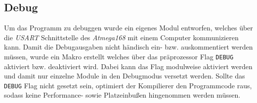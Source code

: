 \subsection{Debug}
    Um das Programm zu debuggen wurde ein eigenes Modul entworfen, welches
    über die \textit{USART} Schnittstelle des \textit{Atmega168} mit einem
    Computer kommunizieren kann. Damit die Debugausgaben nicht händisch
    ein- bzw. auskommentiert werden müssen, wurde ein Makro erstellt welches 
    über das präprozessor Flag \texttt{DEBUG} aktiviert bzw. deaktiviert wird.
    Dabei kann das Flag modulweise aktiviert werden und damit nur einzelne
    Module in den Debugmodus versetzt werden. Sollte das \texttt{DEBUG} Flag
    nicht gesetzt sein, optimiert der Kompilierer den Programmcode raus, sodass
    keine Performance- sowie Platzeinbußen hingenommen werden müssen.
    